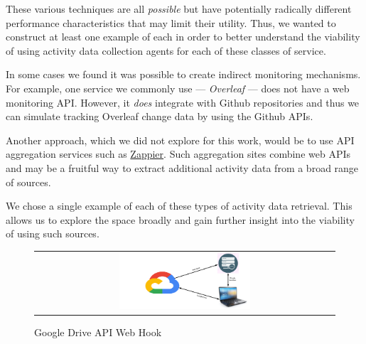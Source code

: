 \documentclass[sigconf,anonymous,review]{acmart}
\begin{document}
These various techniques are all \emph{possible} but have potentially radically
different performance characteristics that may limit their utility.  Thus, we
wanted to construct at least one example of each in order to better understand
the viability of using activity data collection agents for each of these classes
of service.

In some cases we found it was possible to create indirect monitoring mechanisms.
For example, one service we commonly use --- \emph{Overleaf} --- does not have a
web monitoring API.  However, it \emph{does} integrate with Github repositories
and thus we can simulate tracking Overleaf change data by using the Github APIs.

Another approach, which we did not explore for this work, would be to use API
aggregation services such as \href{https://zappier.com}{Zappier}.  Such
aggregation sites combine web APIs and may be a fruitful way to extract
additional activity data from a broad range of sources.

We chose a single example of each of these types of activity data retrieval.
This allows us to explore the space broadly and gain further insight into the
viability of using such sources.

\begin{figure}
    \centering
    \caption{Google Drive API Web Hook}\label{fig:google-web-hook}
    \begin{tabular}{c}
        \includegraphics[width=0.45\textwidth]{figures/google-cloud-monitor.png}
    \end{tabular}
\end{figure}
\end{document}
